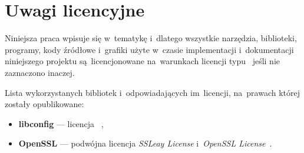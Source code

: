 \documentclass[thesis]{subfiles}
\begin{document}

\section{Uwagi licencyjne}

Niniejsza praca wpisuje się w~tematykę  i~dlatego wszystkie narzędzia, biblioteki, programy, kody źródłowe i~grafiki użyte w~czasie implementacji i~dokumentacji niniejszego projektu są~licencjonowane na~warunkach licencji typu~ jeśli nie zaznaczono inaczej.

Lista wykorzystanych bibliotek i~odpowiadających im~licencji, na~prawach której zostały opublikowane:
\begin{itemize}
\item \textbf{libconfig} --- licencja ~\cite{libconfig-webpage},
\item \textbf{OpenSSL} --- podwójna licencja \emph{SSLeay License} i~\emph{OpenSSL License}~\cite{openssl-license}.
\end{itemize}

\end{document}
